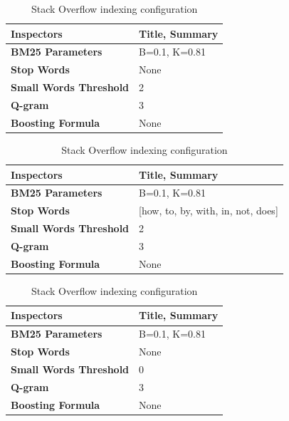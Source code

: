 {\begin{table}[ht] 
{\footnotesize
\begin{tabular}{ P{3cm} ||P{10.1cm}  }      %
 \hline \hline
\textbf{Inspectors} & Title, Summary \T\B 
\\ 
\hline
\textbf{BM25 Parameters} & B=0.1, K=0.81\T\B 
\\ 
\hline
\textbf{Stop Words} & None\T\B 
\\ 
\hline
\textbf{Small Words Threshold} & 2\T\B 
\\ 
\hline
\textbf{Q-gram} & 3\T\B 
\\ 
\hline
\textbf{Boosting Formula} & None\T\B 
\\ 
\hline \hline
    \end{tabular}
}
  \captionsetup{justification=centering,margin=2cm}
  \caption{Stack Overflow indexing configuration}
\end{table}


\begin{table}[ht] 
{\footnotesize
\begin{tabular}{ P{3cm} ||P{10.1cm}  }      %
 \hline \hline
\textbf{Inspectors} & Title, Summary \T\B 
\\ 
\hline
\textbf{BM25 Parameters} & B=0.1, K=0.81\T\B 
\\ 
\hline
\textbf{Stop Words} & [how, to, by, with, in, not, does]\T\B 
\\ 
\hline
\textbf{Small Words Threshold} & 2\T\B 
\\ 
\hline
\textbf{Q-gram} & 3\T\B 
\\ 
\hline
\textbf{Boosting Formula} & None\T\B 
\\ 
\hline \hline
    \end{tabular}
}
  \captionsetup{justification=centering,margin=2cm}
  \caption{Stack Overflow indexing configuration}
\end{table}

\begin{table}[ht] 
{\footnotesize
\begin{tabular}{ P{3cm} ||P{10.1cm}  }      %
 \hline \hline
\textbf{Inspectors} & Title, Summary \T\B 
\\ 
\hline
\textbf{BM25 Parameters} & B=0.1, K=0.81\T\B 
\\ 
\hline
\textbf{Stop Words} & None\T\B 
\\ 
\hline
\textbf{Small Words Threshold} & 0\T\B 
\\ 
\hline
\textbf{Q-gram} & 3\T\B 
\\ 
\hline
\textbf{Boosting Formula} & None\T\B 
\\ 
\hline \hline
    \end{tabular}
}
  \captionsetup{justification=centering,margin=2cm}
  \caption{Stack Overflow indexing configuration}
\end{table}

}
